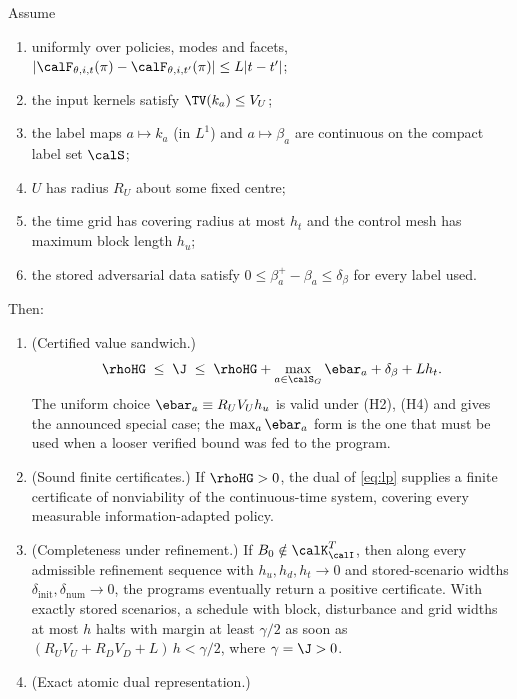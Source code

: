 \begin{theorem}\label{thm:bridge}
Assume
\begin{enumerate}[label=\textup{(H\arabic*)},leftmargin=3em,itemsep=1pt]
\item uniformly over policies, modes and facets, $|\calF_{\theta,i,t}(\pi)-\calF_{\theta,i,t'}(\pi)|\le L|t-t'|$;
\item the input kernels satisfy $\TV(k_a)\le V_U$;
\item the label maps $a\mapsto k_a$ (in $L^1$) and $a\mapsto\beta_a$ are continuous on the compact label set $\calS$;
\item $U$ has radius $R_U$ about some fixed centre;
\item the time grid has covering radius at most $h_t$ and the control mesh has maximum block length $h_u$;
\item the stored adversarial data satisfy $0\le\beta^+_a-\beta_a\le\delta_\beta$ for every label used.
\end{enumerate}
Then:
\begin{enumerate}[label=\textup{(\roman*)},leftmargin=2.4em,itemsep=2pt]
\item \textup{(Certified value sandwich.)}
\begin{equation}\label{eq:sandwich}
\rhoHG\;\le\;\J\;\le\;\rhoHG+\max_{a\in\calS_G}\ebar_a+\delta_\beta+Lh_t .
\end{equation}
The uniform choice $\ebar_a\equiv R_UV_Uh_u$ is valid under \textup{(H2), (H4)} and gives the announced special case; the $\max_a\ebar_a$ form is the one that must be used when a looser verified bound was fed to the program.
\item \textup{(Sound finite certificates.)} If $\rhoHG>0$, the dual of \eqref{eq:lp} supplies a finite certificate of nonviability of the continuous-time system, covering every measurable information-adapted policy.
\item \textup{(Completeness under refinement.)} If $B_0\notin\calK^T_\calI$, then along every admissible refinement sequence with $h_u,h_d,h_t\to0$ and stored-scenario widths $\delta_{\mathrm{init}},\delta_{\mathrm{num}}\to0$, the programs eventually return a positive certificate. With exactly stored scenarios, a schedule with block, disturbance and grid widths at most $h$ halts with margin at least $\gamma/2$ as soon as $(R_UV_U+R_DV_D+L)\,h<\gamma/2$, where $\gamma=\J>0$.
\item \textup{(Exact atomic dual representation.)}
\begin{equation}\label{eq:atomic}

\end{equation}
\end{enumerate}
\end{theorem}
